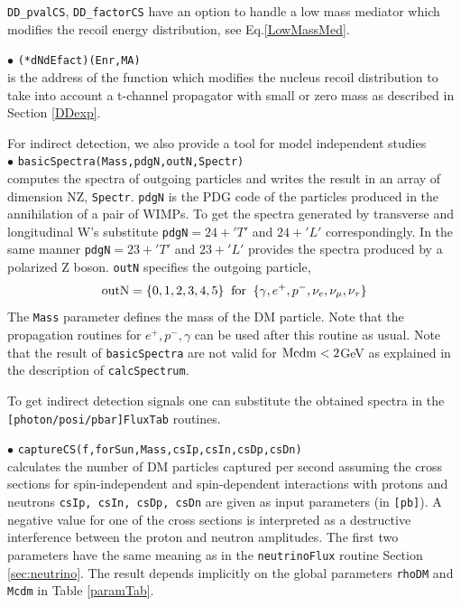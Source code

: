 \documentclass[12pt,a4paper]{article}
\begin{document}
\verb|DD_pvalCS|, \verb|DD_factorCS|   have an option to handle  a low mass mediator which  modifies the recoil energy
distribution, see Eq.\ref{LowMassMed}.



\noindent
$\bullet$ \verb|(*dNdEfact)(Enr,MA)|\\
is the address of the function which modifies the nucleus recoil distribution to take into account a 
t-channel propagator  with  small or zero mass as described in Section \ref{DDexp}.





For indirect detection, we also provide a tool for model independent studies\\ 
\noindent
$\bullet$ \verb|basicSpectra(Mass,pdgN,outN,Spectr)|\\
computes the spectra of outgoing particles and writes the result in an array of dimension NZ, \verb|Spectr|.
\verb|pdgN| is the PDG code of the particles produced in the annihilation of a pair of 
WIMPs. To get the spectra generated by transverse and longitudinal W's substitute 
\verb|pdgN|$=24+'T'$ and $24+'L'$ correspondingly. In the same manner \verb|pdgN|$=23+'T'$ and
$23+'L'$  provides the spectra produced by a polarized Z boson.
 \verb|outN|  specifies the outgoing particle,
$$ {\rm outN} = \{0,1,2,3,4,5\} \;\; {\rm for}\;\; \{\gamma,   e^+,  p^-, \nu_e,
\nu_{\mu},\nu_{\tau}\} $$
The {\tt Mass} parameter defines the mass of the DM particle.
Note that the  propagation routines for $e^+,p^-,\gamma$ can be used after 
this routine as usual. Note that the result of {\tt basicSpectra}
are not valid for ${\rm Mcdm} < 2$GeV as explained in the description of {\tt calcSpectrum}.  

To get indirect detection signals one can substitute the obtained spectra in the\\ 
{\tt [photon/posi/pbar]FluxTab} routines.
  

\noindent $\bullet$ \verb|captureCS(f,forSun,Mass,csIp,csIn,csDp,csDn)|\\
calculates the number of DM particles captured per second assuming the cross sections
for  spin-independent and spin-dependent 
interactions with protons and neutrons   {\tt csIp, csIn, csDp, csDn} are
given as input parameters (in {\tt [pb]}). 
A negative value for one of the cross sections  is interpreted as a destructive
interference between the  proton and neutron amplitudes. The first two
parameters have the same meaning as in the {\tt neutrinoFlux} routine Section \ref{sec:neutrino}. The
result  depends implicitly on the global parameters {\tt rhoDM} and {\tt
Mcdm} in Table \ref{paramTab}. 
\end{document}
